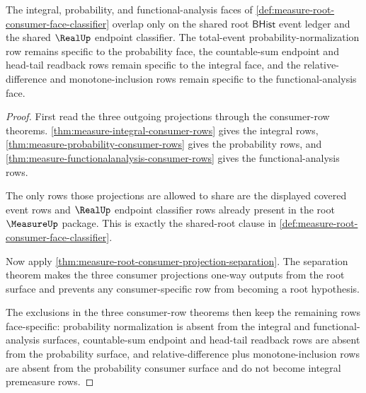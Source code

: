\begin{theorem}
\label{thm:measure-root-consumer-face-disjointness}
The integral, probability, and functional-analysis faces of
\autoref{def:measure-root-consumer-face-classifier} overlap only on the
shared root $\mathsf{BHist}$ event ledger and the shared $\RealUp$ endpoint
classifier. The total-event probability-normalization row remains specific
to the probability face, the countable-sum endpoint and head-tail readback
rows remain specific to the integral face, and the relative-difference and
monotone-inclusion rows remain specific to the functional-analysis face.
\end{theorem}
\begin{proof}
First read the three outgoing projections through the consumer-row theorems.
\autoref{thm:measure-integral-consumer-rows} gives the integral rows,
\autoref{thm:measure-probability-consumer-rows} gives the probability rows,
and \autoref{thm:measure-functionalanalysis-consumer-rows} gives the
functional-analysis rows.

The only rows those projections are allowed to share are the displayed
covered event rows and $\RealUp$ endpoint classifier rows already present in
the root $\MeasureUp$ package. This is exactly the shared-root clause in
\autoref{def:measure-root-consumer-face-classifier}.

Now apply
\autoref{thm:measure-root-consumer-projection-separation}. The separation
theorem makes the three consumer projections one-way outputs from the root
surface and prevents any consumer-specific row from becoming a root
hypothesis.

The exclusions in the three consumer-row theorems then keep the remaining
rows face-specific: probability normalization is absent from the integral and
functional-analysis surfaces, countable-sum endpoint and head-tail readback
rows are absent from the probability surface, and relative-difference plus
monotone-inclusion rows are absent from the probability consumer surface and
do not become integral premeasure rows.
\end{proof}

